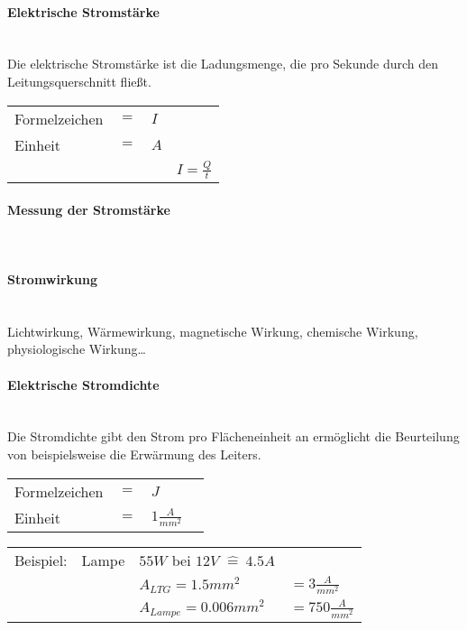 		\paragraph{Elektrische Stromstärke}~\\
		
\noindent Die elektrische Stromstärke ist die Ladungsmenge, die pro Sekunde durch den Leitungsquerschnitt fließt.

\begin{tabular}{llll}
Formelzeichen	& $=$ & $I$ &\\
Einheit			& $=$ & $A$ &\\
& & & $I = \frac{Q}{t}$\\
\end{tabular}	
		
		\paragraph{Messung der Stromstärke}~\\
		\paragraph{Stromwirkung}~\\
		
\noindent Lichtwirkung, Wärmewirkung, magnetische Wirkung, chemische Wirkung, physiologische Wirkung\dots		
		
		\paragraph{Elektrische Stromdichte}~\\
		
\noindent Die Stromdichte gibt den Strom pro Flächeneinheit an ermöglicht die Beurteilung von beispielsweise die Erwärmung des Leiters.	

\begin{tabular}{llll}
Formelzeichen	& $=$ & $J$ &\\
Einheit			& $=$ & $1\frac{A}{mm^2}$ &\\
\end{tabular}\newline

\begin{tabular}{llll}
Beispiel: & Lampe & $55W$ bei $12V$ $\widehat{=}\ 4.5A$ &\\
& & $A_{LTG} = 1.5mm^2$ & $= 3\frac{A}{mm^2}$\\
& & $A_{Lampe} = 0.006mm^2$ & $= 750\frac{A}{mm^2}$\\
\end{tabular}
		
